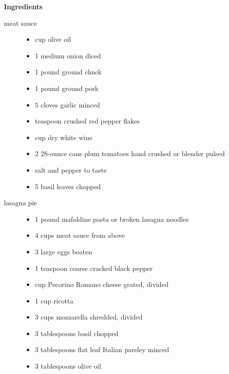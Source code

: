 \documentclass[web-recipes.tex]{subfiles}
\begin{document}
\renewcommand{\mytitle}{Lasagna Pie}
\renewcommand{\myurl}{https://www.sipandfeast.com/lasagna-pie/}
\myRecipe{Mains}{\mytitle{}}


  \begin{minipage}[t]{0.35\textwidth}
    {\sffamily\bfseries Ingredients}\vspace{0.5ex}
    \begin{description}
      \item[meat sauce] \hfill
        \begin{itemize}
          \item {} cup olive oil
          \item 1 medium onion diced
          \item 1 pound ground chuck
          \item 1 pound ground pork
          \item 5 cloves garlic minced
          \item {} teaspoon crushed red pepper flakes
          \item {} cup dry white wine
          \item 2 28-ounce cans plum tomatoes hand crushed or blender pulsed
          \item salt and pepper to taste
          \item 5 basil leaves chopped
        \end{itemize}
      \item[lasagna pie] \hfill
        \begin{itemize}
          \item 1 pound mafaldine pasta or broken lasagna noodles
          \item 4 cups meat sauce from above
          \item 3 large eggs beaten
          \item 1 teaspoon coarse cracked black pepper
          \item {} cup Pecorino Romano cheese grated, divided
          \item 1 cup ricotta
          \item 3 cups mozzarella shredded, divided
          \item 3 tablespoons basil chopped
          \item 3 tablespoons flat leaf Italian parsley minced
          \item 3 tablespoons olive oil
        \end{itemize}
    \end{description}
  \end{minipage}
\end{document}

